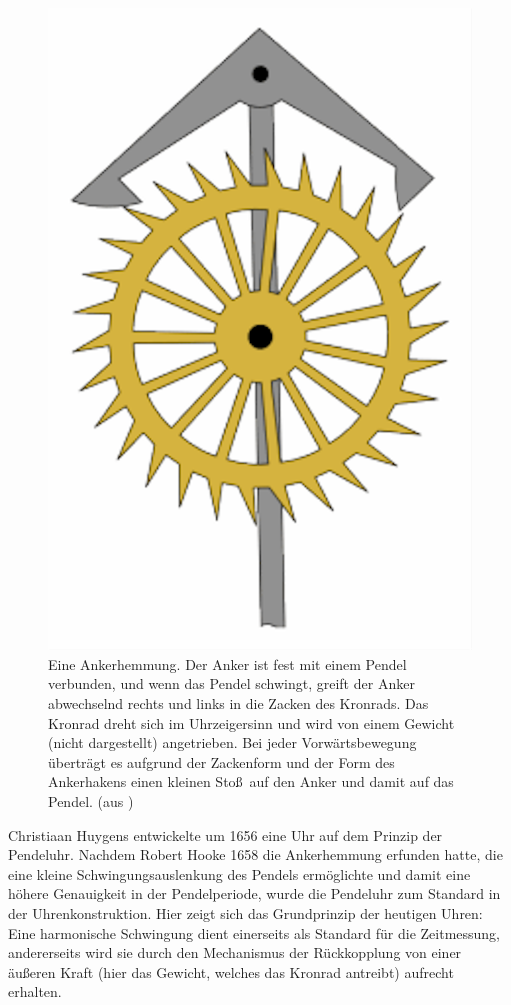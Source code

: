 \begin{figure}[htb]
\includegraphics[trim=2 2 2 2,clip,scale=0.3]{./Bilder/Anker_35.png}
\caption{\label{fig_Anker}%
Eine Ankerhemmung. Der Anker ist fest mit einem Pendel verbunden, und wenn das Pendel schwingt, greift
der Anker abwechselnd rechts und links in die Zacken des Kronrads. Das Kronrad dreht sich im Uhrzeigersinn
und wird von einem Gewicht (nicht dargestellt) angetrieben. Bei jeder Vorw\"artsbewegung \"ubertr\"agt es 
aufgrund der Zackenform und der Form des Ankerhakens einen kleinen Sto\ss\ auf den Anker und damit auf
das Pendel. (aus \cite{Verge})}
\end{figure}

Christiaan Huygens 
entwickelte um 1656 eine Uhr auf dem Prinzip der Pendeluhr. Nachdem Robert Hooke
1658 die Ankerhemmung erfunden hatte, die eine kleine Schwingungsauslenkung des Pendels erm\"oglichte und damit
eine h\"ohere Genauigkeit in der Pendelperiode, wurde die Pendeluhr zum Standard in der Uhrenkonstruktion. 
Hier zeigt sich das Grundprinzip der heutigen Uhren: Eine harmonische Schwingung dient einerseits
als Standard f\"ur die Zeitmessung, andererseits wird sie durch den Mechanismus der R\"uckkopplung
von einer \"au\ss eren Kraft (hier das Gewicht, welches das Kronrad antreibt) aufrecht erhalten. 

